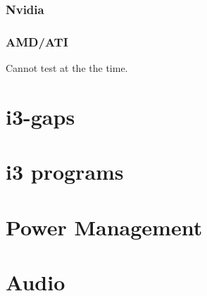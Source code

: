 \documentclass[10pt, a4paper, onecolumn, openany]{book} %
\begin{document}
\subsection{Nvidia}
\subsection{AMD/ATI}
Cannot test at the the time.

\chapter{i3-gaps}


\chapter{i3 programs}


\chapter{Power Management}



\chapter{Audio}



\end{document}
